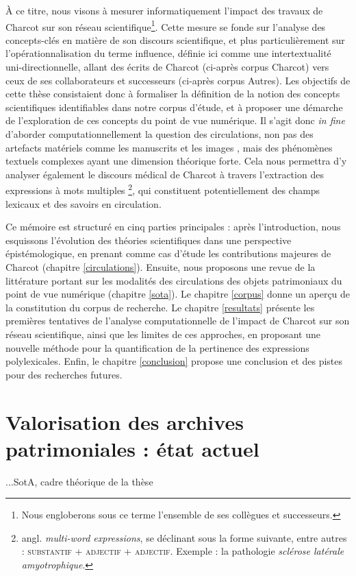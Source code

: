 À ce titre, nous visons à mesurer informatiquement l'impact des travaux de Charcot sur son réseau scientifique\footnote{Nous engloberons sous ce terme l'ensemble de ses collègues et successeurs.}. Cette mesure se fonde sur l'analyse des concepts-clés en matière de son discours scientifique, et plus particulièrement sur l'opérationnalisation du terme \og{}influence\fg{}, définie ici comme une intertextualité uni-directionnelle, allant des écrits de Charcot (ci-après corpus \og{}Charcot\fg{}) vers ceux de ses collaborateurs et successeurs (ci-après corpus \og{}Autres\fg{}). Les objectifs de cette thèse consistaient donc à formaliser la définition de la notion des concepts scientifiques identifiables dans notre corpus d'étude, et à proposer une démarche de l'exploration de ces concepts du point de vue numérique. Il s'agit donc \textit{in fine} d'aborder computationnellement la question des circulations, non pas des artefacts matériels comme les manuscrits \citep{gabay2021katabase} et les images \citep{joyeux2019visual}, mais des phénomènes textuels complexes \citep{manjavacas} ayant une dimension théorique forte. Cela nous permettra d'y analyser également le discours médical de Charcot à travers l'extraction des expressions à mots multiples \citep[p. 96]{nerima2006}\footnote{angl. \textit{multi-word expressions}, se déclinant sous la forme suivante, entre autres : \textsc{substantif + adjectif + adjectif}. Exemple : la pathologie \textit{sclérose latérale amyotrophique}.}, qui constituent potentiellement des champs lexicaux et des savoirs en circulation.

Ce mémoire est structuré en cinq parties principales : après l'introduction, nous esquissons l'évolution des théories scientifiques dans une perspective épistémologique, en prenant comme cas d'étude les contributions majeures de Charcot (chapitre \ref{circulations}).
Ensuite, nous proposons une revue de la littérature portant sur les modalités des circulations des objets patrimoniaux du point de vue numérique (chapitre \ref{sota}). Le chapitre \ref{corpus} donne un aperçu de la constitution du corpus de recherche. Le chapitre \ref{resultats} présente les premières tentatives de l'analyse computationnelle de l'impact de Charcot sur son réseau scientifique, ainsi que les limites de ces approches, en proposant une nouvelle méthode pour la quantification de la pertinence des expressions polylexicales. Enfin, le chapitre \ref{conclusion} propose une conclusion et des pistes pour des recherches futures.

\section{Valorisation des archives patrimoniales : état actuel}
...SotA, cadre théorique de la thèse

